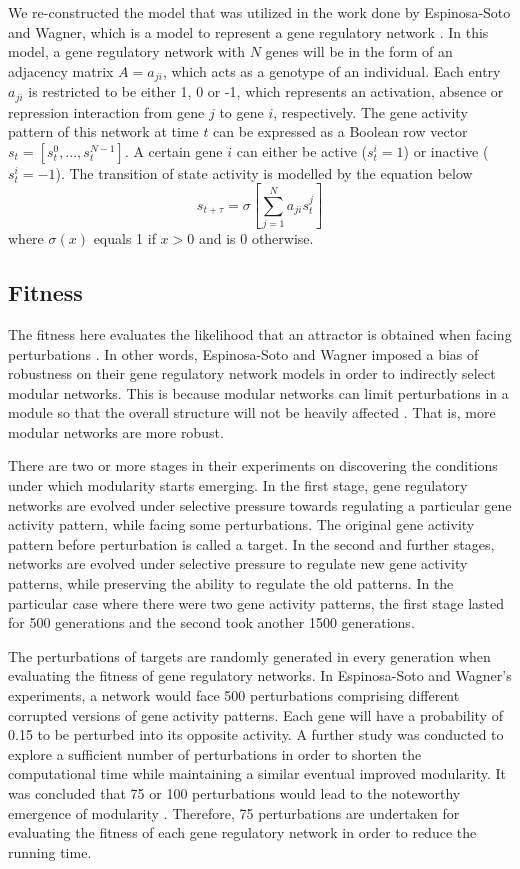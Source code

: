 We re-constructed the model that was utilized in the work done by Espinosa-Soto and Wagner, which is a model to represent a gene regulatory network \cite{espinosa2010specialization}. In this model, a gene regulatory network with $N$ genes will be in the form of an adjacency matrix $A = a_{ji}$, which acts as a genotype of an individual. Each entry $a_{ji}$ is restricted to be either 1, 0 or -1, which represents an activation, absence or repression interaction from gene $j$ to gene $i$, respectively. The gene activity pattern of this network at time $t$ can be expressed as a Boolean row vector $s_{t} = [s_{t}^0,...,s_{t}^{N-1}]$. A certain gene $i$ can either be active ($s_t^i=1$) or inactive ($s_t^i=-1$). The transition of state activity is modelled by the equation below
\begin{equation}
s_{t+\tau}=\sigma[\sum_{j=1}^{N}a_{ji}s_t^j]
\end{equation}
where $\sigma(x)$ equals 1 if $x>0$ and is 0 otherwise. 

\subsection{Fitness}
The fitness here evaluates the likelihood that an attractor is obtained when facing perturbations \cite{espinosa2010specialization}. In other words, Espinosa-Soto and Wagner imposed a bias of robustness on their gene regulatory network models in order to indirectly select modular networks. This is because modular networks can limit perturbations in a module so that the overall structure will not be heavily affected \cite{aderems2005sys}. That is, more modular networks are more robust. 

There are two or more stages in their experiments on discovering the conditions under which modularity starts emerging. In the first stage, gene regulatory networks are evolved under selective pressure towards regulating a particular gene activity pattern, while facing some perturbations. The original gene activity pattern before perturbation is called a target. In the second and further stages, networks are evolved under selective pressure to regulate new gene activity patterns, while preserving the ability to regulate the old patterns. In the particular case where there were two gene activity patterns, the first stage lasted for 500 generations and the second took another 1500 generations. 

The perturbations of targets are randomly generated in every generation when evaluating the fitness of gene regulatory networks. In Espinosa-Soto and Wagner’s experiments, a network would face 500 perturbations comprising different corrupted versions of gene activity patterns. Each gene will have a probability of 0.15 to be perturbed into its opposite activity. A further study was conducted to explore a sufficient number of perturbations in order to shorten the computational time while maintaining a similar eventual improved modularity. It was concluded that 75 or 100 perturbations would lead to the noteworthy emergence of modularity \cite{totten2015perturbation}. Therefore, 75 perturbations are undertaken for evaluating the fitness of each gene regulatory network in order to reduce the running time. 

